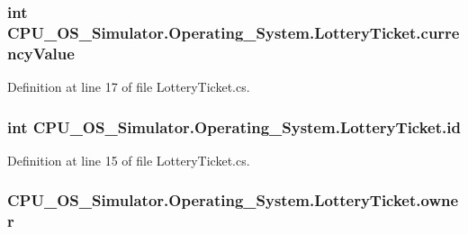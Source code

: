 \subsubsection[{currency\+Value}]{\setlength{\rightskip}{0pt plus 5cm}int C\+P\+U\+\_\+\+O\+S\+\_\+\+Simulator.\+Operating\+\_\+\+System.\+Lottery\+Ticket.\+currency\+Value\hspace{0.3cm}{\ttfamily [private]}}\label{class_c_p_u___o_s___simulator_1_1_operating___system_1_1_lottery_ticket_a70221785d251a61ae812a60325287249}


Definition at line 17 of file Lottery\+Ticket.\+cs.

\hypertarget{class_c_p_u___o_s___simulator_1_1_operating___system_1_1_lottery_ticket_a66f775e493b834d9cfe753bc9961a935}{}
\subsubsection[{id}]{\setlength{\rightskip}{0pt plus 5cm}int C\+P\+U\+\_\+\+O\+S\+\_\+\+Simulator.\+Operating\+\_\+\+System.\+Lottery\+Ticket.\+id\hspace{0.3cm}{\ttfamily [private]}}\label{class_c_p_u___o_s___simulator_1_1_operating___system_1_1_lottery_ticket_a66f775e493b834d9cfe753bc9961a935}


Definition at line 15 of file Lottery\+Ticket.\+cs.

\hypertarget{class_c_p_u___o_s___simulator_1_1_operating___system_1_1_lottery_ticket_a7b67cf29ab87500cc907a30357d858fd}{}
\subsubsection[{owner}]{ C\+P\+U\+\_\+\+O\+S\+\_\+\+Simulator.\+Operating\+\_\+\+System.\+Lottery\+Ticket.\+owner\hspace{0.3cm}{\ttfamily [private]}}\label{class_c_p_u___o_s___simulator_1_1_operating___system_1_1_lottery_ticket_a7b67cf29ab87500cc907a30357d858fd}


